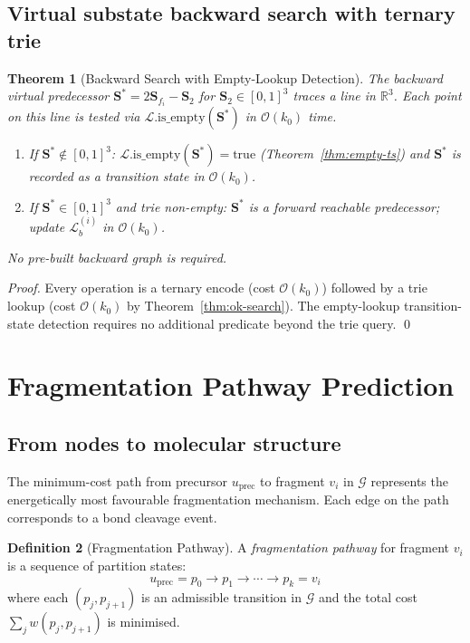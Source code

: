 \documentclass[twocolumn,10pt,a4paper]{article}
\theoremstyle{thmstyle}
\newtheorem{theorem}{Theorem}[section]
\theoremstyle{definition}
\newtheorem{definition}[theorem]{Definition}
\theoremstyle{remark}
\newcommand{\R}{\mathbb{R}}
\newcommand{\Sv}{\mathbf{S}}
\newcommand{\calG}{\mathcal{G}}
\begin{document}
\subsection{Virtual substate backward search with ternary trie}

\begin{theorem}[Backward Search with Empty-Lookup Detection]
\label{thm:backward-reduction}
The backward virtual predecessor
$\Sv^* = 2\Sv_{f_i} - \Sv_2$ for $\Sv_2 \in [0,1]^3$
traces a line in $\R^3$. Each point on this line is tested via
$\mathcal{L}.\text{is\_empty}(\Sv^*)$ in $\mathcal{O}(k_0)$ time.
\begin{enumerate}[nosep,label=(\roman*)]
\item If $\Sv^* \notin [0,1]^3$: $\mathcal{L}.\text{is\_empty}(\Sv^*)
  = \text{true}$ (Theorem~\ref{thm:empty-ts}) and $\Sv^*$ is recorded
  as a transition state in $\mathcal{O}(k_0)$.
\item If $\Sv^* \in [0,1]^3$ and trie non-empty: $\Sv^*$ is a forward
  reachable predecessor; update $\mathcal{L}_b^{(i)}$ in
  $\mathcal{O}(k_0)$.
\end{enumerate}
No pre-built backward graph is required.
\end{theorem}

\begin{proof}
Every operation is a ternary encode (cost $\mathcal{O}(k_0)$)
followed by a trie lookup (cost $\mathcal{O}(k_0)$ by
Theorem~\ref{thm:ok-search}). The empty-lookup transition-state
detection requires no additional predicate beyond the trie query.
\qed
\end{proof}

\section{Fragmentation Pathway Prediction}
\label{sec:prediction}

\subsection{From nodes to molecular structure}

The minimum-cost path from precursor $u_\text{prec}$ to fragment $v_i$
in $\calG$ represents the energetically most favourable fragmentation
mechanism. Each edge on the path corresponds to a bond cleavage event.

\begin{definition}[Fragmentation Pathway]
\label{def:pathway}
A \emph{fragmentation pathway} for fragment $v_i$ is a sequence of
partition states:
\begin{equation}
u_\text{prec} = p_0 \to p_1 \to \cdots \to p_k = v_i
\end{equation}
where each $(p_j, p_{j+1})$ is an admissible transition in $\calG$
and the total cost $\sum_j w(p_j, p_{j+1})$ is minimised.
\end{definition}
\end{document}

